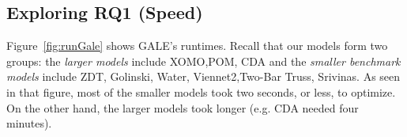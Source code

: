 \documentclass[10pt,journal,compsoc]{IEEEtran}
\newcommand{\fig}[1]{Figure~\ref{fig:#1}}
\begin{document}
 

\subsection{Exploring RQ1 (Speed)}

\fig{runGale} shows GALE's runtimes.
Recall that our models form two groups:
the {\em larger models} include XOMO,POM, CDA
and the {\em smaller benchmark models} include  ZDT, Golinski, Water, Viennet2,Two-Bar Truss, Srivinas.
As seen in that figure,
most of the smaller models took two seconds, or less,  to optimize.
On the other hand, the larger models took longer (e.g. CDA needed four minutes).
\end{document}

